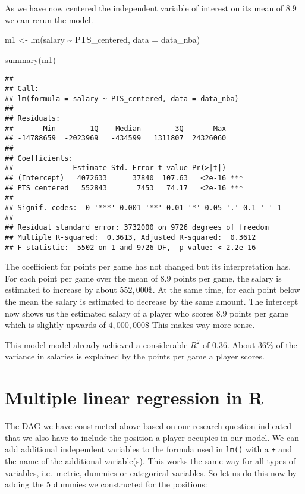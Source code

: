 \documentclass[
]{book}
\newenvironment{Shaded}{\begin{snugshade}}{\end{snugshade}}
\newcommand{\AttributeTok}[1]{\textcolor[rgb]{0.77,0.63,0.00}{#1}}
\newcommand{\FunctionTok}[1]{\textcolor[rgb]{0.00,0.00,0.00}{#1}}
\newcommand{\NormalTok}[1]{#1}
\newcommand{\OtherTok}[1]{\textcolor[rgb]{0.56,0.35,0.01}{#1}}
\newcommand{\SpecialCharTok}[1]{\textcolor[rgb]{0.00,0.00,0.00}{#1}}
\begin{document}
As we have now centered the independent variable of interest on its mean of \(8.9\)
we can rerun the model.

\begin{Shaded}
\begin{Highlighting}[]
\NormalTok{m1 }\OtherTok{\textless{}{-}} \FunctionTok{lm}\NormalTok{(salary }\SpecialCharTok{\textasciitilde{}}\NormalTok{ PTS\_centered, }\AttributeTok{data =}\NormalTok{ data\_nba)}

\FunctionTok{summary}\NormalTok{(m1)}
\end{Highlighting}
\end{Shaded}

\begin{verbatim}
## 
## Call:
## lm(formula = salary ~ PTS_centered, data = data_nba)
## 
## Residuals:
##       Min        1Q    Median        3Q       Max 
## -14788659  -2023969   -434599   1311807  24326060 
## 
## Coefficients:
##              Estimate Std. Error t value Pr(>|t|)    
## (Intercept)   4072633      37840  107.63   <2e-16 ***
## PTS_centered   552843       7453   74.17   <2e-16 ***
## ---
## Signif. codes:  0 '***' 0.001 '**' 0.01 '*' 0.05 '.' 0.1 ' ' 1
## 
## Residual standard error: 3732000 on 9726 degrees of freedom
## Multiple R-squared:  0.3613, Adjusted R-squared:  0.3612 
## F-statistic:  5502 on 1 and 9726 DF,  p-value: < 2.2e-16
\end{verbatim}

The coefficient for points per game has not changed but its interpretation has.
For each point per game over the mean of \(8.9\) points per game, the salary is
estimated to increase by about \(552,000\$\). At the same time, for each point
below the mean the salary is estimated to decrease by the same amount.
The intercept now shows us the estimated salary of a player who scores \(8.9\)
points per game which is slightly upwards of \(4,000,000\$\) This makes way more
sense.

This model model already achieved a considerable \(R^2\) of \(0.36\). About \(36\%\)
of the variance in salaries is explained by the points per game a player scores.

\hypertarget{multiple-linear-regression-in-r}{%
\section{Multiple linear regression in R}\label{multiple-linear-regression-in-r}}

The DAG we have constructed above based on our research question indicated that
we also have to include the position a player occupies in our model.
We can add additional independent variables to the formula used in \texttt{lm()} with a
\texttt{+} and the name of the additional variable(s). This works the same way for all
types of variables, i.e.~metric, dummies or categorical variables.
So let us do this now by adding the 5 dummies we constructed for the positions:
\end{document}
